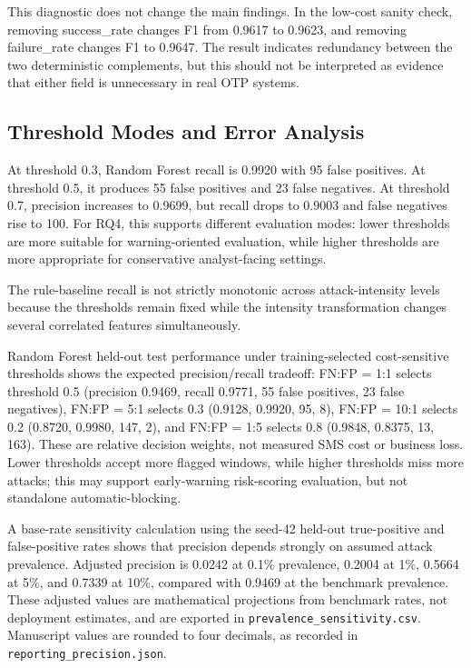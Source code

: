 \documentclass[conference]{IEEEtran}
\begin{document}
This diagnostic does not change the main findings. In the low-cost sanity check, removing success\_rate changes F1 from 0.9617 to 0.9623, and removing failure\_rate changes F1 to 0.9647. The result indicates redundancy between the two deterministic complements, but this should not be interpreted as evidence that either field is unnecessary in real OTP systems.

\subsection{Threshold Modes and Error Analysis}

At threshold 0.3, Random Forest recall is 0.9920 with 95 false positives. At threshold 0.5, it produces 55 false positives and 23 false negatives. At threshold 0.7, precision increases to 0.9699, but recall drops to 0.9003 and false negatives rise to 100. For RQ4, this supports different evaluation modes: lower thresholds are more suitable for warning-oriented evaluation, while higher thresholds are more appropriate for conservative analyst-facing settings.

The rule-baseline recall is not strictly monotonic across attack-intensity levels because the thresholds remain fixed while the intensity transformation changes several correlated features simultaneously.

Random Forest held-out test performance under training-selected cost-sensitive thresholds shows the expected precision/recall tradeoff: FN:FP = 1:1 selects threshold 0.5 (precision 0.9469, recall 0.9771, 55 false positives, 23 false negatives), FN:FP = 5:1 selects 0.3 (0.9128, 0.9920, 95, 8), FN:FP = 10:1 selects 0.2 (0.8720, 0.9980, 147, 2), and FN:FP = 1:5 selects 0.8 (0.9848, 0.8375, 13, 163). These are relative decision weights, not measured SMS cost or business loss. Lower thresholds accept more flagged windows, while higher thresholds miss more attacks; this may support early-warning risk-scoring evaluation, but not standalone automatic-blocking.

A base-rate sensitivity calculation using the seed-42 held-out true-positive and false-positive rates shows that precision depends strongly on assumed attack prevalence. Adjusted precision is 0.0242 at 0.1\% prevalence, 0.2004 at 1\%, 0.5664 at 5\%, and 0.7339 at 10\%, compared with 0.9469 at the benchmark prevalence. These adjusted values are mathematical projections from benchmark rates, not deployment estimates, and are exported in \texttt{prevalence\_sensitivity.csv}. Manuscript values are rounded to four decimals, as recorded in \texttt{reporting\_precision.json}.
\end{document}
